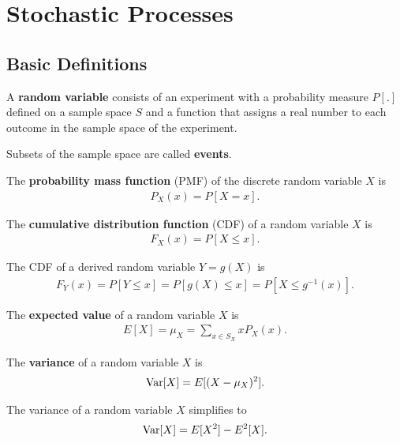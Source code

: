 \documentclass{memoir}
\begin{document}
\section{Stochastic Processes}
\subsection{Basic Definitions}
\begin{definition}
    A \textbf{random variable} consists of an experiment with a probability measure $P[.]$ defined on a sample space $S$ and a function that assigns a real number to each outcome in the sample space of the experiment.
\end{definition}

\begin{definition}
    Subsets of the sample space are called \textbf{events}.
\end{definition}

\begin{definition}
    The \textbf{probability mass function} (PMF) of the discrete random variable $X$ is
    \begin{align*}
        P_X(x) = P[X=x].
    \end{align*}
\end{definition}

\begin{definition}
    The \textbf{cumulative distribution function} (CDF) of a random variable $X$ is
    \begin{align*}
        F_X(x) = P[X \le x].
    \end{align*}
\end{definition}
The CDF of a derived random variable $Y=g(X)$ is
\begin{align*}
    F_{Y}(x) = P[Y \le x] = P[g(X) \le x] = P[X \le g^{-1}(x)].
\end{align*}

\begin{definition}
    The \textbf{expected value} of a random variable $X$ is
    \begin{align*}
        E[X]=\mu_X = \sum_{x \in S_X} x P_X(x).
    \end{align*}
\end{definition}

\begin{definition}
    The \textbf{variance} of a random variable $X$ is
    \begin{align*}
        \operatorname{Var}[X] = E[(X-\mu_X)^2].
    \end{align*}
\end{definition}
The variance of a random variable $X$ simplifies to
\begin{align*}
    \operatorname{Var}[X] = E[X^2] - E^2[X].
\end{align*}
\end{document}
